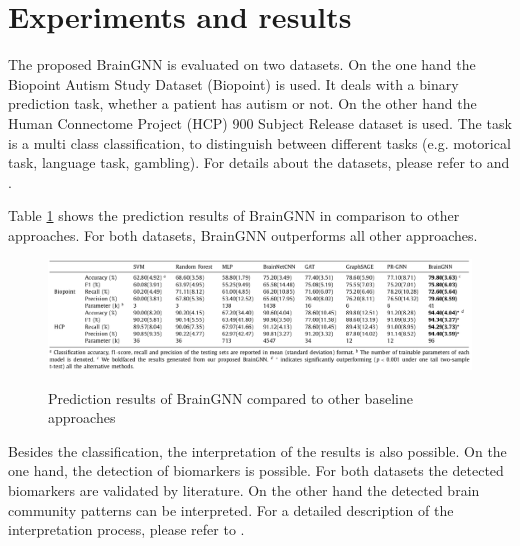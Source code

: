 \section{Experiments and results} \label{experimental_setup}


The proposed BrainGNN is evaluated on two datasets. On the one hand the Biopoint Autism Study Dataset (Biopoint) \cite{Venkataraman2016BayesianCD} is used. It deals with a binary prediction task, whether a patient has autism or not. On the other hand the Human Connectome Project (HCP) 900 Subject Release dataset \cite{VANESSEN201362} is used. The task is a multi class classification, to distinguish between different tasks (e.g. motorical task, language task, gambling). For details about the datasets, please refer to  \cite{Venkataraman2016BayesianCD} and \cite{VANESSEN201362}.


Table \ref{fig:prediction_results} shows the prediction results of BrainGNN in comparison to other approaches. For both datasets, BrainGNN outperforms all other approaches.

\begin{figure}[ht]
	\centering
	\includegraphics[width=1.0\linewidth]{figures/predictionResults.png}
	\caption{Prediction results of BrainGNN compared to other baseline approaches}
	\cite{LI2021102233}
	\label{fig:prediction_results}
\end{figure}


Besides the classification, the interpretation of the results is also possible.
On the one hand, the detection of biomarkers is possible. For both datasets the detected biomarkers are validated by literature. 
On the other hand the detected brain community patterns can be interpreted.
For a detailed description of the interpretation process, please refer to \cite{LI2021102233}.
